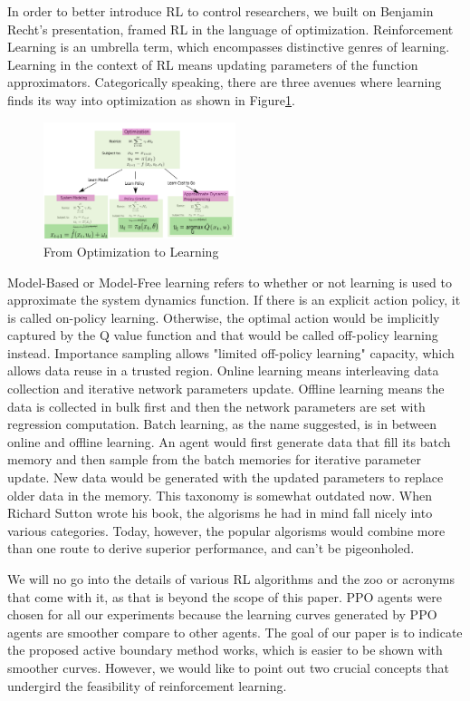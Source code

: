 \documentclass[journal]{IEEEtran}
\begin{document}
In order to better introduce RL to control researchers, we built on Benjamin Recht's presentation\cite{Recht2018ATO}, framed RL in the language of optimization. Reinforcement Learning is an umbrella term, which encompasses distinctive genres of learning. Learning in the context of RL means updating parameters of the function approximators. Categorically speaking, there are three avenues where learning finds its way into optimization as shown in Figure\ref{fig:1}. 
\begin{figure}
    \centering
    \includegraphics[width=0.5\textwidth]{Control.png}
    \caption{From Optimization to Learning}
    \label{fig:1}
\end{figure}

Model-Based or Model-Free learning refers to whether or not learning is used to approximate the system dynamics function. If there is an explicit action policy, it is called on-policy learning. Otherwise, the optimal action would be implicitly captured by the Q value function and that would be called off-policy learning instead. Importance sampling allows "limited off-policy learning" capacity, which allows data reuse in a trusted region. Online learning means interleaving data collection and iterative network parameters update. Offline learning means the data is collected in bulk first and then the network parameters are set with regression computation. Batch learning, as the name suggested, is in between online and offline learning. An agent would first generate data that fill its batch memory and then sample from the batch memories for iterative parameter update. New data would be generated with the updated parameters to replace older data in the memory. This taxonomy is somewhat outdated now. When Richard Sutton wrote his book, the algorisms he had in mind fall nicely into various categories. Today, however, the popular algorisms would combine more than one route to derive superior performance, and can't be pigeonholed.

We will no go into the details of various RL algorithms and the zoo or acronyms that come with it, as that is beyond the scope of this paper. PPO agents were chosen for all our experiments because the learning curves generated by PPO agents are smoother compare to other agents. The goal of our paper is to indicate the proposed active boundary method works, which is easier to be shown with smoother curves. However, we would like to point out two crucial concepts that undergird the feasibility of reinforcement learning.
\end{document}
